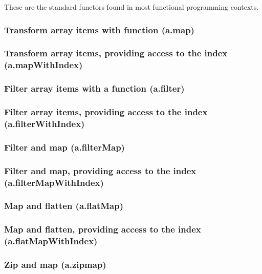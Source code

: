 \documentclass{article}
\theoremstyle{definition}
\begin{document}
These are the standard functors found in most functional programming contexts.

\subsubsection{Transform array items with function (a.map)}

\subsubsection{Transform array items, providing access to the index (a.mapWithIndex)}

\subsubsection{Filter array items with a function (a.filter)}

\subsubsection{Filter array items, providing access to the index (a.filterWithIndex)}

\subsubsection{Filter and map (a.filterMap)}

\subsubsection{Filter and map, providing access to the index (a.filterMapWithIndex)}

\subsubsection{Map and flatten (a.flatMap)}

\subsubsection{Map and flatten, providing access to the index (a.flatMapWithIndex)}

\subsubsection{Zip and map (a.zipmap)}
\end{document}
